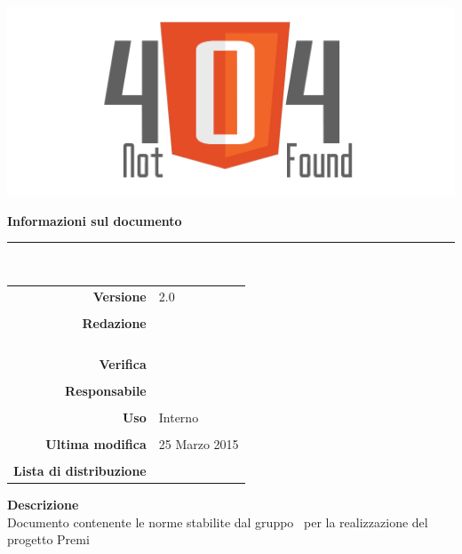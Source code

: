 \thispagestyle{empty}

\begin{titlepage}
	\begin{center}
	\begin{Huge}
		\textbf{\gruppo} \\
	\end{Huge}
	\vspace{0.5cm}
	\begin{Large}
		\textbf{\capitolato}
	\end{Large}
	
	\vspace{1cm}
    
	\includegraphics[scale=0.35]{../logo/logo404_Extends.png}
	\vspace{1cm}
	\begin{Huge}
		\textbf{\titDoc}
	\end{Huge}
	
	\vspace{1cm}
	\textbf{Informazioni sul documento}\\
    \rule{10cm}{.4pt} \\
	\begin{table}[h]
	\begin{center}
	\begin{tabular}{r | l}
		\textbf{Versione} & 2.0 \\ \\
		\textbf{Redazione} & \CoMa \\
			& \ReAn \\ 
			& \DeEn \\ 
			& \CaMa \\ \\
		\textbf{Verifica} &\MaMo \\ \\
		\textbf{Responsabile} & \GoIs \\ \\
		\textbf{Uso} & Interno \\ \\
		\textbf{Ultima modifica} & 25 Marzo 2015 \\ \\
		\textbf{Lista di distribuzione} & \gruppo \\ 
	\end{tabular}
	\end{center}
	\end{table}
			\textbf{Descrizione} \\
			Documento contenente le norme stabilite dal gruppo \gruppo\ per la realizzazione del progetto Premi
	\end{center}
\end{titlepage}
